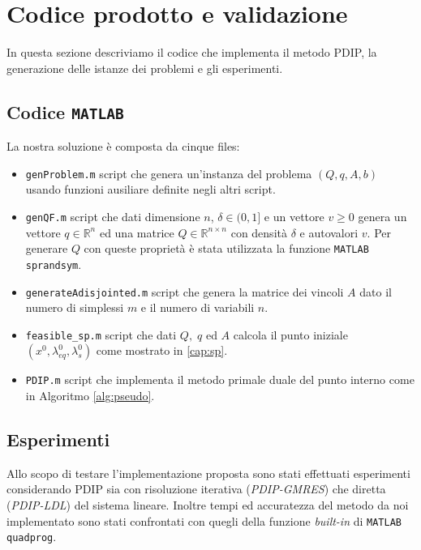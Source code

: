 
\section{Codice prodotto e validazione}
In questa sezione descriviamo il codice che implementa il metodo PDIP, la generazione delle istanze dei problemi e gli esperimenti.

\subsection{Codice \texttt{MATLAB}}
La nostra soluzione è composta da cinque files:

\begin{itemize}
    \item \texttt{genProblem.m} script che genera un'instanza del problema $(Q,q,A,b)$ usando funzioni ausiliare definite negli altri script.
    \item \texttt{genQF.m} script che dati dimensione $n$, $\delta \in (0,1]$ e un vettore $v\geq0$ genera un vettore $q\in\mathbb{R}^n$ ed una matrice $Q \in \mathbb{R}^{n \times n}$ con densità $\delta$ e autovalori $v$.
    Per generare $Q$ con queste proprietà è stata utilizzata la funzione \texttt{MATLAB} \texttt{sprandsym}.
    
   \item \texttt{generateAdisjointed.m} script che genera la matrice dei vincoli $A$ dato il numero di simplessi $m$ e il numero di variabili $n$.
    \item \texttt{feasible\_sp.m} script che dati $Q, \;q$ ed $A$ calcola il punto iniziale $(x^0, \lambda_{eq}^0, \lambda_s^0)$ come mostrato in \ref{cap:sp}.
    
    \item \texttt{PDIP.m} script che implementa il metodo primale duale del punto interno come in Algoritmo \ref{alg:pseudo}.
    
\end{itemize}


\subsection{Esperimenti}
Allo scopo di testare l'implementazione proposta sono stati effettuati esperimenti considerando PDIP sia con risoluzione iterativa (\emph{PDIP-GMRES}) che diretta (\textit{PDIP-LDL}) del sistema lineare.
Inoltre tempi ed accuratezza del metodo da noi implementato sono stati confrontati con quegli della funzione \textit{built-in} di \texttt{MATLAB} \texttt{quadprog}.

